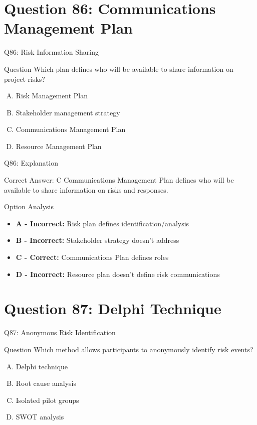 \documentclass{beamer}
\begin{document}
	\section{Question 86: Communications Management Plan}
	
	\begin{frame}{Q86: Risk Information Sharing}
		\begin{block}{Question}
			Which plan defines who will be available to share information on project risks?
		\end{block}
		\begin{enumerate}[(A)]
			\item Risk Management Plan
			\item Stakeholder management strategy
			\item Communications Management Plan
			\item Resource Management Plan
		\end{enumerate}
	\end{frame}
	
	\begin{frame}{Q86: Explanation}
		\begin{block}{Correct Answer: C}
			Communications Management Plan defines who will be available to share information on risks and responses.
		\end{block}
		\begin{block}{Option Analysis}
			\begin{itemize}
				\item \textbf{A - Incorrect:} Risk plan defines identification/analysis
				\item \textbf{B - Incorrect:} Stakeholder strategy doesn't address
				\item \textbf{C - Correct:} Communications Plan defines roles
				\item \textbf{D - Incorrect:} Resource plan doesn't define risk communications
			\end{itemize}
		\end{block}
	\end{frame}
	
	\section{Question 87: Delphi Technique}
	
	\begin{frame}{Q87: Anonymous Risk Identification}
		\begin{block}{Question}
			Which method allows participants to anonymously identify risk events?
		\end{block}
		\begin{enumerate}[(A)]
			\item Delphi technique
			\item Root cause analysis
			\item Isolated pilot groups
			\item SWOT analysis
		\end{enumerate}
	\end{frame}
	
\end{document}

